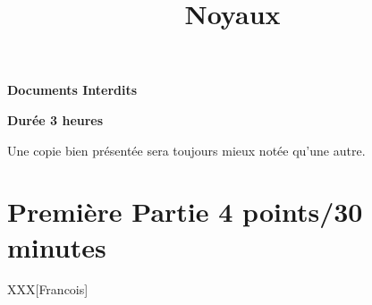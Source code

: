 %
%
%
%
%
%

%
%

%
%

\def\path{../../..}

%
%



%
%


%
%

\title{Noyaux}

%
%



%
%

\maketitle

%
%

\indentation{}

%
%

\begin{center}

\textbf{Documents Interdits}

\textbf{Dur\'ee 3 heures}

\scriptsize{Une copie bien pr\'esent\'ee sera toujours mieux not\'ee
            qu'une autre.}

\end{center}

%
%

%
%

\section{Premi\`ere Partie \hfill{} \scriptsize{4 points/30 minutes}}

XXX[Francois]

%
%

